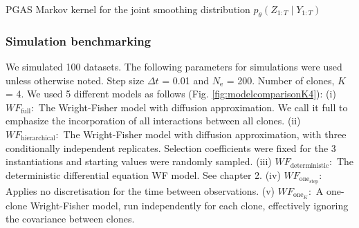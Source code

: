 \documentclass{article}
\newcommand{\eps}{N_\text{e}}
\begin{document}
\begin{algorithm}
\caption{PGAS Markov kernel for the joint smoothing distribution $p_{\theta}(Z_{1:T} \mid Y_{1:T})$} \label{alg:PGASSSM}
\end{algorithm}



\subsubsection{Simulation benchmarking}
We simulated 100 datasets. 
The following parameters for simulations were used unless otherwise noted. 
Step size $\Delta t$ = 0.01 and $\eps$ = 200. 
Number of clones, $K$ = 4.
We used 5 different models as follows (Fig. \ref{fig:modelcomparisonK4}):
(i) $WF_{\text{full}}:$ The Wright-Fisher model with diffusion approximation. 
We call it full to emphasize the incorporation of all interactions between all clones.
(ii) $WF_{\text{hierarchical}}:$
The Wright-Fisher model with diffusion approximation, with three conditionally independent replicates. 
Selection coefficients were fixed for the 3 instantiations and starting values were randomly sampled.
(iii) $WF_{\text{deterministic}}:$ The deterministic differential equation WF model. See chapter 2.
(iv) $WF_{\text{one}_{\text{step}}}:$ Applies no discretisation for the time between observations. 
(v) $WF_{\text{one}_K}:$ A one-clone Wright-Fisher model, run independently for each clone, effectively ignoring the covariance between clones.
\end{document}

